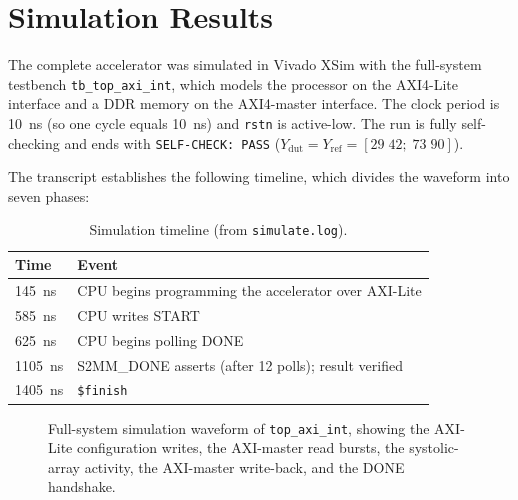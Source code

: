
\section{Simulation Results}

The complete accelerator was simulated in Vivado XSim with the full-system
testbench \texttt{tb\_top\_axi\_int}, which models the processor on the
AXI4-Lite interface and a DDR memory on the AXI4-master interface. The clock
period is \SI{10}{\nano\second} (so one cycle equals \SI{10}{\nano\second}) and
\texttt{rstn} is active-low. The run is fully self-checking and ends with
\texttt{SELF-CHECK: PASS} ($Y_\text{dut}=Y_\text{ref}=[29\;42;\;73\;90]$).

The transcript establishes the following timeline, which divides the waveform
into seven phases:

\begin{table}[h]
\centering
\begin{tabular}{ll}
\toprule
\textbf{Time} & \textbf{Event} \\
\midrule
\SI{145}{ns}  & CPU begins programming the accelerator over AXI-Lite \\
\SI{585}{ns}  & CPU writes START \\
\SI{625}{ns}  & CPU begins polling DONE \\
\SI{1105}{ns} & S2MM\_DONE asserts (after 12 polls); result verified \\
\SI{1405}{ns} & \texttt{\$finish} \\
\bottomrule
\end{tabular}
\caption{Simulation timeline (from \texttt{simulate.log}).}
\label{tab:timeline}
\end{table}

\begin{figure}[h]
\centering
\caption{Full-system simulation waveform of \texttt{top\_axi\_int}, showing the
AXI-Lite configuration writes, the AXI-master read bursts, the systolic-array
activity, the AXI-master write-back, and the DONE handshake.}
\label{fig:wave}
\end{figure}

